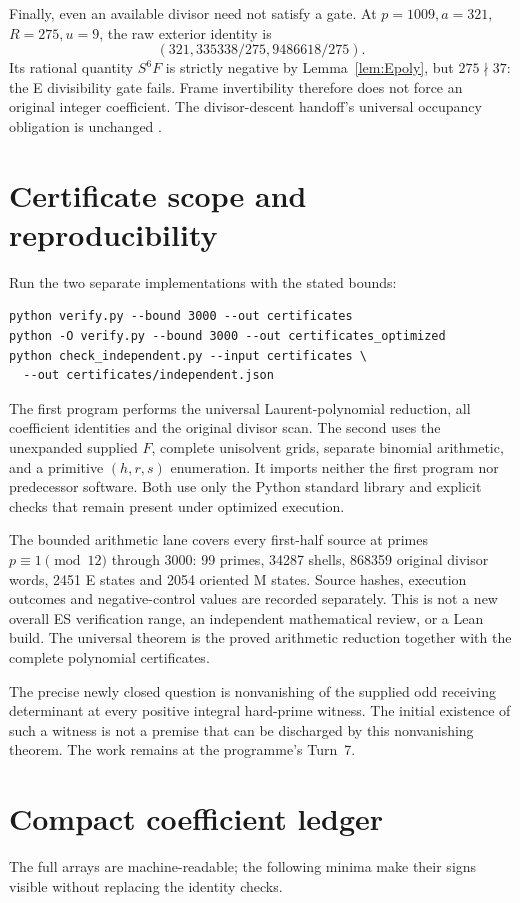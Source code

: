 Finally, even an available divisor need not satisfy a gate. At $p=1009,a=321$,
$R=275,u=9$, the raw exterior identity is
\[
 (321,335338/275,9486618/275).
\]
Its rational quantity $S^6F$ is strictly negative by Lemma~\ref{lem:Epoly}, but
$275\nmid37$: the E divisibility gate fails. Frame invertibility therefore does not force an original
integer coefficient. The divisor-descent handoff's universal occupancy
obligation is unchanged \cite{Descent}.

\section{Certificate scope and reproducibility}
Run the two separate implementations with the stated bounds:
\begin{verbatim}
python verify.py --bound 3000 --out certificates
python -O verify.py --bound 3000 --out certificates_optimized
python check_independent.py --input certificates \
  --out certificates/independent.json
\end{verbatim}
The first program performs the universal Laurent-polynomial reduction, all
coefficient identities and the original divisor scan. The second uses the
unexpanded supplied $F$, complete unisolvent grids, separate binomial arithmetic,
and a primitive $(h,r,s)$ enumeration. It imports neither the first program nor
predecessor software. Both use only the Python standard library and explicit
checks that remain present under optimized execution.

The bounded arithmetic lane covers every first-half source at primes
$p\equiv1\pmod{12}$ through 3000: 99 primes, 34287 shells, 868359 original
divisor words, 2451 E states and 2054 oriented M states. Source hashes,
execution outcomes and negative-control values are recorded separately.
This is not a new overall ES verification range, an independent mathematical
review, or a Lean build. The universal theorem is the proved arithmetic
reduction together with the complete polynomial certificates.

The precise newly closed question is nonvanishing of the supplied odd
receiving determinant at every positive integral hard-prime witness. The
initial existence of such a witness is not a premise that can be discharged
by this nonvanishing theorem. The work remains at the programme's Turn~7.

\appendix
\section{Compact coefficient ledger}
The full arrays are machine-readable; the following minima make their signs
visible without replacing the identity checks.

